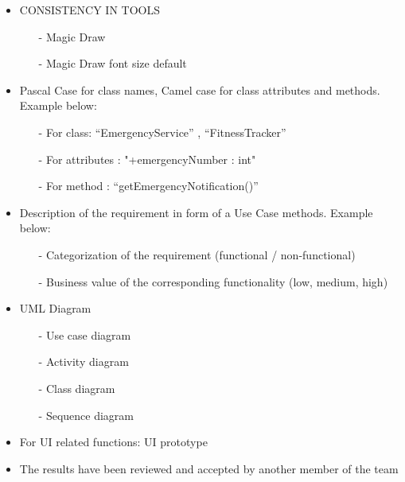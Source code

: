 \documentclass{article}
\begin{document}
\begin{itemize}
\item
  CONSISTENCY IN TOOLS
  \begin{itemize}
	\item[-] Magic Draw
	\item[-] Magic Draw font size default
   \end{itemize}
\end{itemize}


\begin{itemize}
\item
  Pascal Case for class names, Camel case for class attributes and
  methods. Example below:
  \begin{itemize}
	\item[-] For class: ``EmergencyService'' , ``FitnessTracker''
	\item[-] For attributes : "+emergencyNumber : int"
	\item[-] For method : ``getEmergencyNotification()''
   \end{itemize}
\end{itemize}

\begin{itemize}
\item
  Description of the requirement in form of a Use Case
  methods. Example below:
  \begin{itemize}
	\item[-] Categorization of the requirement (functional / non-functional)
	\item[-] Business value of the corresponding functionality (low, medium, high)
   \end{itemize}
\end{itemize}

\begin{itemize}
\item
  UML Diagram
  \begin{itemize}
	\item[-] Use case diagram
	\item[-] Activity diagram
	\item[-] Class diagram
	\item[-] Sequence diagram
   \end{itemize}
\end{itemize}

\begin{itemize}
\item
  For UI related functions: UI prototype
\item
  The results have been reviewed and accepted by another member of the
  team
\end{itemize}
\end{document}
